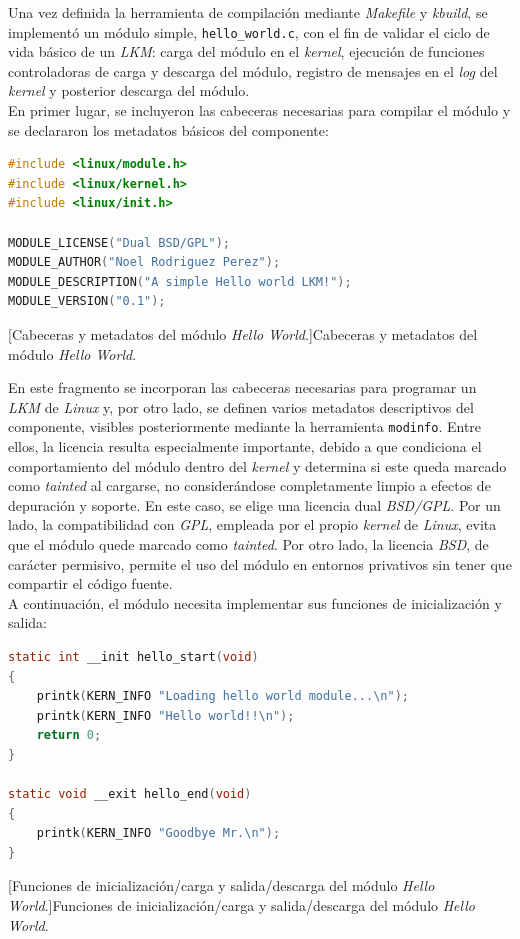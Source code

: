 Una vez definida la herramienta de compilación mediante \textit{Makefile} y \textit{kbuild}, se implementó un módulo simple, \verb|hello_world.c|, con el fin de validar el ciclo de vida básico de un \textit{LKM}: carga del módulo en el \textit{kernel}, ejecución de funciones controladoras de carga y descarga del módulo, registro de mensajes en el \textit{log} del \textit{kernel} y posterior descarga del módulo.\\

En primer lugar, se incluyeron las cabeceras necesarias para compilar el módulo y se declararon los metadatos básicos del componente:\\

\begin{lstlisting}[language=C]
#include <linux/module.h>
#include <linux/kernel.h>
#include <linux/init.h>

MODULE_LICENSE("Dual BSD/GPL");
MODULE_AUTHOR("Noel Rodriguez Perez");
MODULE_DESCRIPTION("A simple Hello world LKM!");
MODULE_VERSION("0.1");
\end{lstlisting}
\captionsetup{type=code,justification=centering,singlelinecheck=false}
[Cabeceras y metadatos del módulo \textit{Hello World}.]{Cabeceras y metadatos del módulo \textit{Hello World}.}
\label{cod:hello_headers}
\vspace{\baselineskip}

En este fragmento se incorporan las cabeceras necesarias para programar un \textit{LKM} de \textit{Linux} y, por otro lado, se definen varios metadatos descriptivos del componente, visibles posteriormente mediante la herramienta \texttt{modinfo}.
Entre ellos, la licencia resulta especialmente importante, debido a que condiciona el comportamiento del módulo dentro del \textit{kernel} y determina si este queda marcado como \textit{tainted} al cargarse, no considerándose completamente limpio a efectos de depuración y soporte.
En este caso, se elige una licencia dual \textit{BSD/GPL}.
Por un lado, la compatibilidad con \textit{GPL}, empleada por el propio \textit{kernel} de \textit{Linux}, evita que el módulo quede marcado como \textit{tainted}.
Por otro lado, la licencia \textit{BSD}, de carácter permisivo, permite el uso del módulo en entornos privativos sin tener que compartir el código fuente.\\

A continuación, el módulo necesita implementar sus funciones de inicialización y salida:

\begin{lstlisting}[language=C]
static int __init hello_start(void)
{
    printk(KERN_INFO "Loading hello world module...\n");
    printk(KERN_INFO "Hello world!!\n");
    return 0;
}

static void __exit hello_end(void)
{
    printk(KERN_INFO "Goodbye Mr.\n");
}
\end{lstlisting}
\captionsetup{type=code,justification=centering,singlelinecheck=false}
[Funciones de inicialización/carga y salida/descarga del módulo \textit{Hello World}.]{Funciones de inicialización/carga y salida/descarga del módulo \textit{Hello World}.}
\label{cod:hello_init_exit}
\vspace{\baselineskip}


